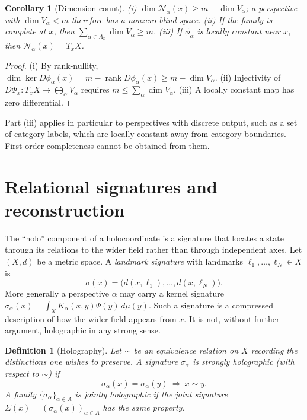 \documentclass[11pt]{article}
\newtheorem{definition}{Definition}
\newtheorem{corollary}{Corollary}
\theoremstyle{remark}
\newcommand{\N}{\mathcal{N}}
\newcommand{\rank}{\operatorname{rank}}
\begin{document}
\begin{corollary}[Dimension count]\label{cor:dim}
(i) $\dim\N_\alpha(x)\ge m-\dim V_\alpha$; a perspective with $\dim V_\alpha<m$ therefore has a nonzero blind space. (ii) If the family is complete at $x$, then $\sum_{\alpha\in A_x}\dim V_\alpha\ge m$. (iii) If $\phi_\alpha$ is locally constant near $x$, then $\N_\alpha(x)=T_xX$.
\end{corollary}

\begin{proof}
(i) By rank-nullity, $\dim\ker D\phi_\alpha(x)=m-\rank D\phi_\alpha(x)\ge m-\dim V_\alpha$. (ii) Injectivity of $D\Phi_x:T_xX\to\bigoplus_\alpha V_\alpha$ requires $m\le\sum_\alpha\dim V_\alpha$. (iii) A locally constant map has zero differential.
\end{proof}

Part (iii) applies in particular to perspectives with discrete output, such as a set of category labels, which are locally constant away from category boundaries. First-order completeness cannot be obtained from them.

\section{Relational signatures and reconstruction}

The ``holo'' component of a holocoordinate is a signature that locates a state through its relations to the wider field rather than through independent axes. Let $(X,d)$ be a metric space. A \emph{landmark signature} with landmarks $\ell_1,\dots,\ell_N\in X$ is
\[
\sigma(x)=\bigl(d(x,\ell_1),\dots,d(x,\ell_N)\bigr).
\]
More generally a perspective $\alpha$ may carry a kernel signature $\sigma_\alpha(x)=\int_XK_\alpha(x,y)\Psi(y)\,d\mu(y)$. Such a signature is a compressed description of how the wider field appears from $x$. It is not, without further argument, holographic in any strong sense.

\begin{definition}[Holography]
Let $\sim$ be an equivalence relation on $X$ recording the distinctions one wishes to preserve. A signature $\sigma_\alpha$ is \emph{strongly holographic} (with respect to $\sim$) if
\[
\sigma_\alpha(x)=\sigma_\alpha(y)\ \Longrightarrow\ x\sim y .
\]
A family $\{\sigma_\alpha\}_{\alpha\in A}$ is \emph{jointly holographic} if the joint signature $\Sigma(x)=(\sigma_\alpha(x))_{\alpha\in A}$ has the same property.
\end{definition}
\end{document}

